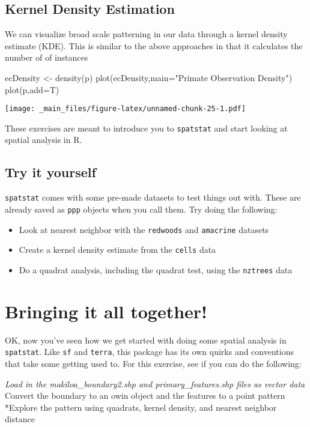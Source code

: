 \documentclass[
]{book}
\newenvironment{Shaded}{\begin{snugshade}}{\end{snugshade}}
\newcommand{\AttributeTok}[1]{\textcolor[rgb]{0.77,0.63,0.00}{#1}}
\newcommand{\FunctionTok}[1]{\textcolor[rgb]{0.00,0.00,0.00}{#1}}
\newcommand{\NormalTok}[1]{#1}
\newcommand{\OtherTok}[1]{\textcolor[rgb]{0.56,0.35,0.01}{#1}}
\newcommand{\StringTok}[1]{\textcolor[rgb]{0.31,0.60,0.02}{#1}}
\providecommand{\tightlist}{%
  \setlength{\itemsep}{0pt}\setlength{\parskip}{0pt}}
\begin{document}
\hypertarget{kernel-density-estimation}{%
\section{Kernel Density Estimation}\label{kernel-density-estimation}}

We can visualize broad scale patterning in our data through a kernel density estimate (KDE). This is similar to the above approaches in that it calculates the number of of instances

\begin{Shaded}
\begin{Highlighting}[]
\NormalTok{ecDensity }\OtherTok{\textless{}{-}} \FunctionTok{density}\NormalTok{(p)}
\FunctionTok{plot}\NormalTok{(ecDensity,}\AttributeTok{main=}\StringTok{"Primate Observation Density"}\NormalTok{)}
\FunctionTok{plot}\NormalTok{(p,}\AttributeTok{add=}\NormalTok{T)}
\end{Highlighting}
\end{Shaded}

\texttt{[image: \_main\_files/figure-latex/unnamed-chunk-25-1.pdf]}

These exercises are meant to introduce you to \texttt{spatstat} and start looking at spatial analysis in R.

\hypertarget{try-it-yourself}{%
\section{Try it yourself}\label{try-it-yourself}}

\texttt{spatstat} comes with some pre-made datasets to test things out with. These are already saved as \texttt{ppp} objects when you call them. Try doing the following:

\begin{itemize}
\tightlist
\item
  Look at nearest neighbor with the \texttt{redwoods} and \texttt{amacrine} datasets
\item
  Create a kernel density estimate from the \texttt{cells} data
\item
  Do a quadrat analysis, including the quadrat test, using the \texttt{nztrees} data
\end{itemize}

\hypertarget{bringing-it-all-together}{%
\chapter{Bringing it all together!}\label{bringing-it-all-together}}

OK, now you've seen how we get started with doing some spatial analysis in \texttt{spatstat}. Like \texttt{sf} and \texttt{terra}, this package has its own quirks and conventions that take some getting used to. For this exercise, see if you can do the following:

\emph{Load in the makiloa\_boundary2.shp and primary\_features.shp files as vector data
}Convert the boundary to an owin object and the features to a point pattern
*Explore the pattern using quadrats, kernel density, and nearest neighbor distance

  
\end{document}
